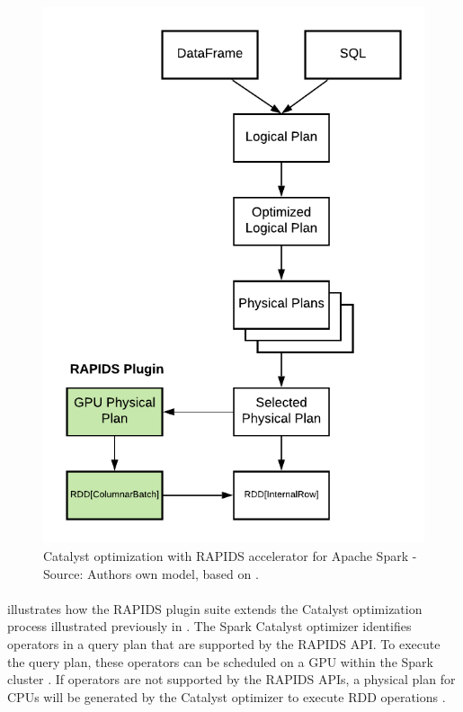 \begin{figure}[h]
\centering
\includegraphics[scale=1]{images/04_technical_background/rapids/rapids_catalyst_optimization_process}
\caption{Catalyst optimization with RAPIDS accelerator for Apache Spark - Source: Authors own model, based on \cite{Mcdonald2020SparkRapids}.}
\label{fig:04_rapids_ext_query-plan}
\end{figure}
\paragraph{} illustrates how the RAPIDS plugin suite extends the Catalyst optimization process illustrated previously in .
The Spark Catalyst optimizer identifies operators in a query plan that are supported by the RAPIDS API. To execute the query plan, these operators can be scheduled on a GPU within the Spark cluster \cite{Mcdonald2020SparkRapids}. If operators are not supported by the RAPIDS APIs, a physical plan for CPUs will be generated by the Catalyst optimizer to execute RDD operations \cite{Mcdonald2020SparkRapids}.


